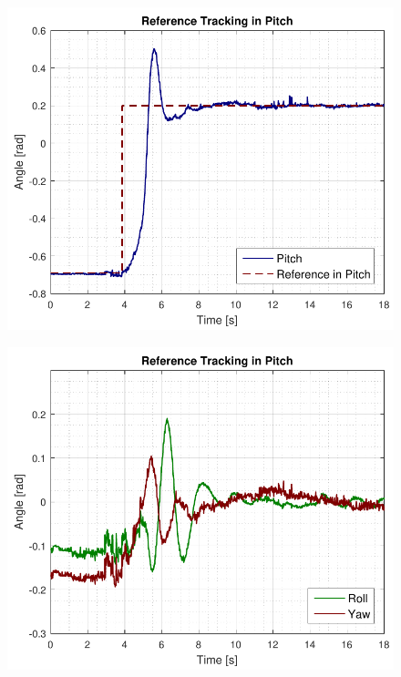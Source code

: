 \begin{minipage}{\linewidth}
    \begin{minipage}{0.46\linewidth}
        \begin{figure}[H]
            \includegraphics[scale=.6]{figures/pitchRefAccept.pdf}
            \centering			
            \label{fig:pitchRefAccept}
        \end{figure}
    \end{minipage}
    \hspace{0.03\linewidth}
    \begin{minipage}{0.46\linewidth}
        \begin{figure}[H]
            \includegraphics[scale=.6]{figures/pitchRefAcceptRollYaw.pdf}
            \centering
            \label{fig:pitchRefAcceptRollYaw}
        \end{figure}
    \end{minipage}
\end{minipage}


